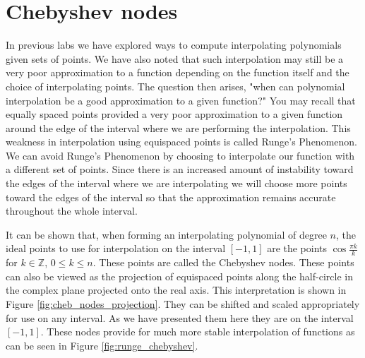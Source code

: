 \label{lab:cheb_interp}


\section*{Chebyshev nodes}

In previous labs we have explored ways to compute interpolating polynomials given sets of points.
We have also noted that such interpolation may still be a very poor approximation to a function depending on the function itself and the choice of interpolating points.
The question then arises, "when can polynomial interpolation be a good approximation to a given function?"
You may recall that equally spaced points provided a very poor approximation to a given function around the edge of the interval where we are performing the interpolation.
This weakness in interpolation using equispaced points is called Runge's Phenomenon.
We can avoid Runge's Phenomenon by choosing to interpolate our function with a different set of points.
Since there is an increased amount of instability toward the edges of the interval where we are interpolating we will choose more points toward the edges of the interval so that the approximation remains accurate throughout the whole interval.

It can be shown that, when forming an interpolating polynomial of degree $n$, the ideal points to use for interpolation on the interval $[-1, 1]$ are the points $\cos{\frac{\pi k}{k}}$ for $k\in\mathbb{Z}$, $0 \leq k \leq n$.
These points are called the Chebyshev nodes.
These points can also be viewed as the projection of equispaced points along the half-circle in the complex plane projected onto the real axis.
This interpretation is shown in Figure \ref{fig:cheb_nodes_projection}.
They can be shifted and scaled appropriately for use on any interval.
As we have presented them here they are on the interval $[-1, 1]$.
These nodes provide for much more stable interpolation of functions as can be seen in Figure \ref{fig:runge_chebyshev}.

